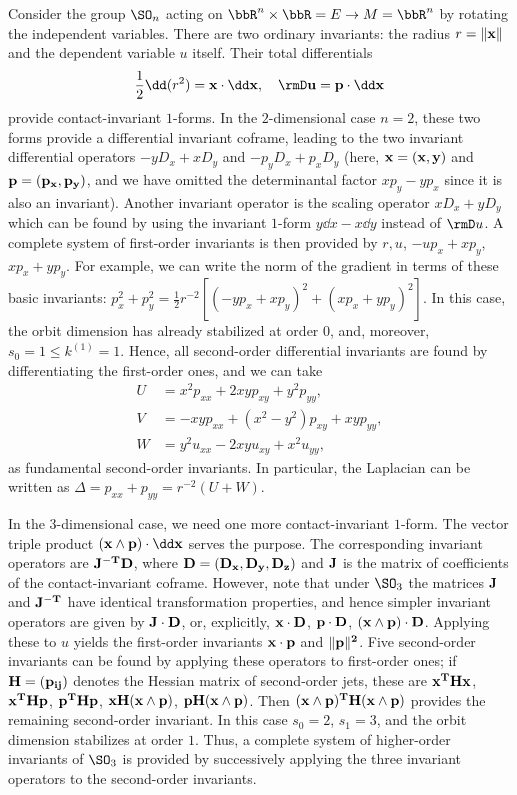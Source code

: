 \begin{example}
    Consider the group $\SO_n$ acting on $\bbR^n\times\bbR=E\to M=\bbR^n$ by rotating the independent variables. There are two ordinary invariants: the radius $r=\lVert \bf{x}\rVert$ and the dependent variable $u$ itself. Their total differentials 
    \[\frac12\dd(r^2)=\bf{x}\cdot\dd\bf{x},\quad \rmD u=\bf{p}\cdot\dd \bf{x}\]
    provide contact-invariant $1$-forms. In the $2$-dimensional case $n=2$, these two forms provide a differential invariant coframe, leading to the two invariant differential operators $-yD_x+xD_y$ and $-p_yD_x+p_x D_y$ (here, $\bf{x}=(x,y)$ and $\bf{p}=(p_x,p_y)$, and we have omitted the determinantal factor $xp_y-yp_x$ since it is also an invariant). Another invariant operator is the scaling operator $xD_x+yD_y$ which can be found by using the invariant $1$-form $y\dd x-x\dd y$ instead of $\rmD u$. A complete system of first-order invariants is then provided by $r,u$, $-up_x+xp_y$, $xp_x+yp_y$. For example, we can write the norm of the gradient in terms of these basic invariants: $p_x^2+p_y^2=\frac12r^{-2}\left[(-yp_x+xp_y)^2+(xp_x+yp_y)^2\right]$. In this case, the orbit dimension has already stabilized at order $0$, and, moreover, $s_0=1\leq k^{(1)}=1$.  Hence, all second-order differential invariants are found by differentiating the first-order ones, and we can take 
    \[\begin{split}
        U & =x^2p_{xx}+2xyp_{xy}+y^2p_{yy},\\
        V&= -xyp_{xx}+(x^2-y^2)p_{xy}+xyp_{yy},\\
        W&=y^2u_{xx}-2xyu_{xy}+x^2u_{yy},
    \end{split}\]
    as fundamental second-order invariants. In particular, the Laplacian can be written as $\Delta=p_{xx}+p_{yy}=r^{-2}(U+W)$.

    In the $3$-dimensional case, we need one more contact-invariant $1$-form. The vector triple product $(\bf{x}\wedge \bf{p})\cdot \dd\bf{x}$ serves the purpose. The corresponding invariant operators are $\bf{J}^{-T}\bf{D}$, where $\bf{D}=(D_x,D_y,D_z)$ and $\bf{J}$ is the matrix of coefficients of the contact-invariant coframe. However, note that under $\SO_3$ the matrices $\bf{J}$ and $\bf{J}^{-T}$ have identical transformation properties, and hence simpler invariant operators are given by $\bf{J}\cdot\bf{D}$, or, explicitly, $\bf{x}\cdot\bf{D}$, $\bf{p}\cdot\bf{D}$, $(\bf{x}\wedge\bf{p})\cdot\bf{D}$. Applying these to $u$ yields the first-order invariants $\bf{x}\cdot\bf{p}$ and $\lVert\bf{p}\rVert^2$. Five second-order invariants can be found by applying these operators to first-order ones; if $\bf{H}=(p_{ij})$ denotes the Hessian matrix of second-order jets, these are $\bf{x}^T\bf{H}\bf{x}$, $\bf{x}^T\bf{H}\bf{p}$, $\bf{p}^T\bf{H}\bf{p}$, $\bf{x}\bf{H}(\bf{x}\wedge\bf{p})$, $\bf{p}\bf{H}(\bf{x}\wedge\bf{p})$. Then $(\bf{x}\wedge\bf{p})^T\bf{H}(\bf{x}\wedge\bf{p})$ provides the remaining second-order invariant. In this case $s_0=2$, $s_1=3$, and the orbit dimension stabilizes at order $1$. Thus, a complete system of higher-order invariants of $\SO_3$ is provided by successively applying the three invariant operators to the second-order invariants.
\end{example}


